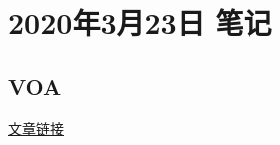 \chapter{2020年3月23日 笔记}
\graphicspath{{note_everyday/001_20200323/picture/}}
\section{VOA}
\href{https://www.51voa.com/VOA_Special_English/when-the-cat-s-away-the-mice-will-play-84151.html}{文章链接}





